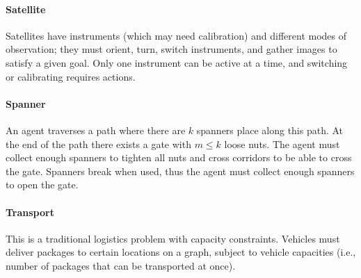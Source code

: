 \paragraph{Satellite}

Satellites have instruments (which may need calibration) and different modes of
observation; they must orient, turn, switch instruments, and gather images to
satisfy a given goal. Only one instrument can be active at a time, and switching
or calibrating requires actions.

\paragraph{Spanner}

An agent traverses a path where there are $k$ spanners place along this path. At
the end of the path there exists a gate with $m \leq k$ loose nuts. The agent
must collect enough spanners to tighten all nuts and cross corridors to be able
to cross the gate. Spanners break when used, thus the agent must collect enough
spanners to open the gate.

\paragraph{Transport}

This is a traditional logistics problem with capacity constraints. Vehicles must
deliver packages to certain locations on a graph, subject to vehicle capacities
(i.e., number of packages that can be transported at once).


